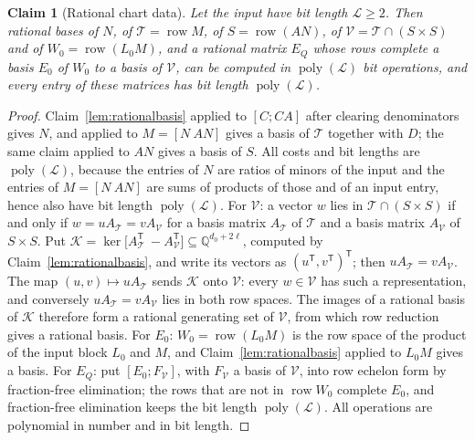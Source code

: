 \documentclass[journal]{IEEEtran}
\theoremstyle{plainn}
\newtheorem{claim}{Claim}
\theoremstyle{remark}
\begin{document}
\begin{claim}[Rational chart data]\label{clm:chartdata}
Let the input have bit length $\mathcal L\ge2$. Then rational bases of $N$, of
$\mathcal T=\operatorname{row}M$, of $S=\operatorname{row}(AN)$, of
$\mathcal V=\mathcal T\cap(S\times S)$ and of $W_0=\operatorname{row}(L_0M)$, and a rational matrix
$E_Q$ whose rows complete a basis $E_0$ of $W_0$ to a basis of $\mathcal V$, can be computed in
$\operatorname{poly}(\mathcal L)$ bit operations, and every entry of these matrices has bit length
$\operatorname{poly}(\mathcal L)$.
\end{claim}

\begin{proof}
Claim~\ref{lem:rationalbasis} applied to $[C;CA]$ after clearing denominators gives $N$, and applied
to $M=[N\ AN]$ gives a basis of $\mathcal T$ together with $D$; the same claim applied to $AN$ gives a
basis of $S$. All costs and bit lengths are $\operatorname{poly}(\mathcal L)$, because the entries of
$N$ are ratios of minors of the input and the entries of $M=[N\ AN]$ are sums of products of those and
of an input entry, hence also have bit length $\operatorname{poly}(\mathcal L)$.
For $\mathcal V$: a vector $w$ lies in $\mathcal T\cap(S\times S)$ if and only if
$w=uA_{\mathcal T}=vA_{\mathcal V}$ for a basis matrix $A_{\mathcal T}$ of $\mathcal T$ and a basis
matrix $A_{\mathcal V}$ of $S\times S$. Put
$\mathcal K=\ker\bigl[A_{\mathcal T}^{\mathsf T}\ {-}A_{\mathcal V}^{\mathsf T}\bigr]\subseteq\mathbb Q^{d_0+2\ell}$,
computed by Claim~\ref{lem:rationalbasis}, and write its vectors as
$(u^{\mathsf T},v^{\mathsf T})^{\mathsf T}$; then $uA_{\mathcal T}=vA_{\mathcal V}$. The map
$(u,v)\mapsto uA_{\mathcal T}$ sends $\mathcal K$ onto $\mathcal V$: every $w\in\mathcal V$ has such a
representation, and conversely $uA_{\mathcal T}=vA_{\mathcal V}$ lies in both row spaces. The images of a
rational basis of $\mathcal K$ therefore form a rational generating set of $\mathcal V$, from which row
reduction gives a rational basis. For $E_0$: $W_0=\operatorname{row}(L_0M)$ is the row space of the product of the input
block $L_0$ and $M$, and Claim~\ref{lem:rationalbasis} applied to $L_0M$ gives a basis. For $E_Q$: put
$[E_0;F_{\mathcal V}]$, with $F_{\mathcal V}$ a basis of $\mathcal V$, into row echelon form by
fraction-free elimination; the rows that are not in $\operatorname{row}W_0$ complete $E_0$, and
fraction-free elimination keeps the bit length $\operatorname{poly}(\mathcal L)$. All operations are
polynomial in number and in bit length.
\end{proof}
\end{document}

